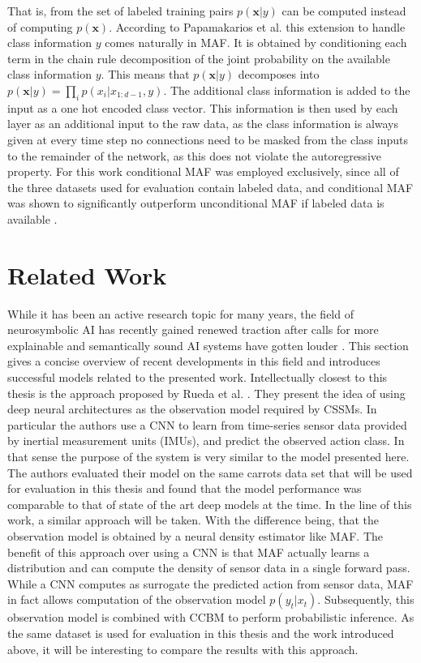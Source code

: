 \documentclass[11pt,titlepage,oneside,openany]{book}
\begin{document}
That is, from the set of labeled training pairs $p(\pmb{x}|y)$ can be computed instead of computing $p(\pmb{x})$. According to Papamakarios et al. \cite{papamakarios_masked_2017} this extension to handle class information $y$ comes naturally in MAF. It is obtained by conditioning each term in the chain rule decomposition of the joint probability on the available class information $y$. This means that $p(\pmb{x}|y)$ decomposes into $p(\pmb{x}|y) = \prod_{i}^{} p(x_i|x_{1:d-1},y)$. The additional class information is added to the input as a one hot encoded class vector. This information is then used by each layer as an additional input to the raw data, as the class information is always given at every time step no connections need to be masked from the class inputs to the remainder of the network, as this does not violate the autoregressive property. For this work conditional MAF was employed exclusively, since all of the three datasets used for evaluation contain labeled data, and conditional MAF was shown to significantly outperform unconditional MAF if labeled data is available \cite{papamakarios_masked_2017}.


\chapter{Related Work}
\label{cha:rel}

While it has been an active research topic for many years, the field of neurosymbolic AI has recently gained renewed traction after calls for more explainable and semantically sound AI systems have gotten louder \cite{garcez_neurosymbolic_2020}. This section gives a concise overview of recent developments in this field and introduces successful models related to the presented work.
Intellectually closest to this thesis is the approach proposed by Rueda et al. \cite{rueda_combining_2019}. They present the idea of using deep neural architectures as the observation model required by CSSMs. In particular the authors use a CNN to learn from time-series sensor data provided by inertial measurement units (IMUs), and predict the observed action class. In that sense the purpose of the system is very similar to the model presented here. The authors evaluated their model on the same carrots data set that will be used for evaluation in this thesis and found that the model performance was comparable to that of state of the art deep models at the time. In the line of this work, a similar approach will be taken. With the difference being, that the observation model is obtained by a neural density estimator like MAF. The benefit of this approach over using a CNN is that MAF actually learns a distribution and can compute the density of sensor data in a single forward pass. While a CNN computes as surrogate the predicted action from sensor data, MAF in fact allows computation of the observation model $p(y_t|x_t)$. Subsequently, this observation model is combined with CCBM to perform probabilistic inference. As the same dataset is used for evaluation in this thesis and the work introduced above, it will be interesting to compare the results with this approach.
\end{document}
